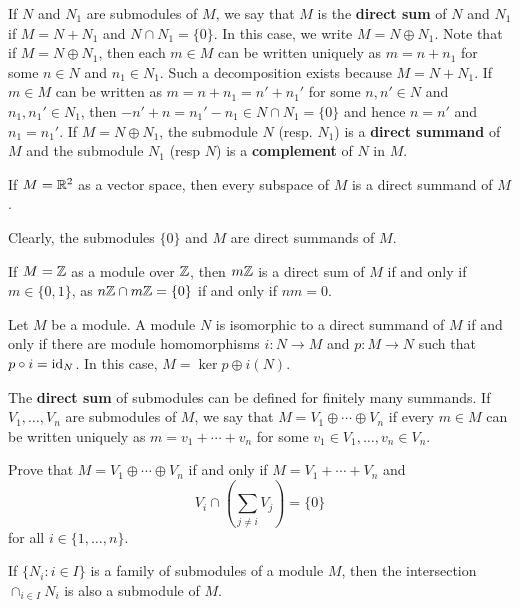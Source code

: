 If $N$ and $N_1$ are submodules of $M$, we say that $M$ is the \textbf{direct sum} of $N$ and $N_1$
if $M=N+N_1$ and $N\cap N_1=\{0\}$. In this case, we write $M=N\oplus N_1$. Note that if
$M=N\oplus N_1$, then each $m\in M$ can be written uniquely as $m=n+n_1$ for some
 $n\in N$ and $n_1\in N_1$. 
Such a decomposition exists because $M=N+N_1$. If $m\in M$ can be written as 
$m=n+n_1=n'+n_1'$ for some $n,n'\in N$ and $n_1,n_1'\in N_1$, then 
$-n'+n=n_1'-n_1\in N\cap N_1=\{0\}$ and hence $n=n'$ and $n_1=n_1'$. If $M=N\oplus N_1$, the submodule
$N$ (resp. $N_1$) is a \textbf{direct summand} of $M$ and the submodule $N_1$ (resp $N$) is a \textbf{complement} of $N$ 
in $M$.   	

\begin{example}
If $M=\mathbb{R}^2$ as a vector space, then every subspace of $M$ is a direct summand of $M$.
\end{example}

Clearly, the submodules $\{0\}$ and $M$ are direct summands of $M$.

\begin{example}
If $M=\mathbb{Z}$ as a module over $\mathbb{Z}$, then $m\mathbb{Z}$ is a direct sum of $M$ if and only if 
$m\in\{0,1\}$, as $n\mathbb{Z}\cap m\mathbb{Z}=\{0\}$ if and only if $nm=0$.
\end{example}

\begin{exercise}
\label{xca:projector}
Let $M$ be a module. 
A module $N$ is isomorphic to a direct summand of $M$ if and only if
there are module homomorphisms $i\colon N\to M$ and $p\colon M\to N$ 
such that $p\circ i=\operatorname{id}_N$. In this case, $M=\ker p\oplus i(N)$.  
\end{exercise}

The \textbf{direct sum} of submodules can be defined for finitely many summands. 
If $V_1,\dots,V_n$ are submodules of $M$, we say that $M=V_1\oplus\cdots\oplus V_n$ 
if every $m\in M$ can be written uniquely as $m=v_1+\cdots+v_n$ for some $v_1\in V_1,\dots,v_n\in V_n$. 

\begin{exercise}
Prove that $M=V_1\oplus\cdots\oplus V_n$ if and only if 
$M=V_1+\cdots+V_n$ and 
\[
V_i\cap\left(\sum_{j\ne i}V_j\right)=\{0\}
\]	
for all $i\in\{1,\dots,n\}$.
\end{exercise}

If $\{N_i:i\in I\}$ is a family of submodules of a module $M$, then the intersection 
$\cap_{i\in I}N_i$ is also a submodule of $M$.

